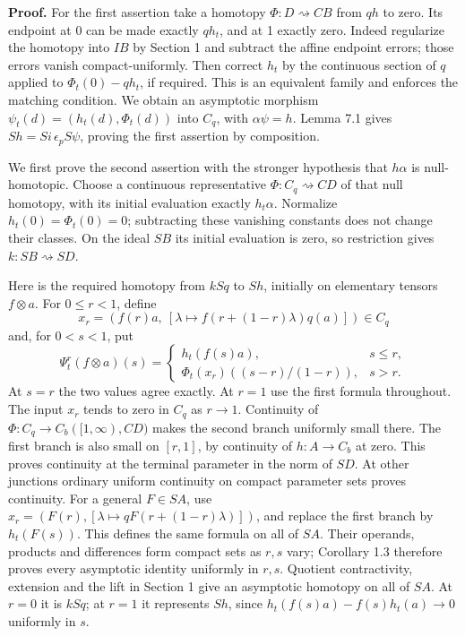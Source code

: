 \documentclass[
  11pt,
]{article}
\begin{document}
\textbf{Proof.} For the first assertion take a homotopy
\(\Phi:D \rightsquigarrow CB\) from \(qh\) to zero. Its endpoint at 0
can be made exactly \(qh_t\), and at 1 exactly zero. Indeed regularize
the homotopy into \(IB\) by Section 1 and subtract the affine endpoint
errors; those errors vanish compact-uniformly. Then correct \(h_t\) by
the continuous section of \(q\) applied to \(\Phi_t(0)-qh_t\), if
required. This is an equivalent family and enforces the matching
condition. We obtain an asymptotic morphism
\(\psi_t(d)=(h_t(d),\Phi_t(d))\) into \(C_q\), with \(\alpha\psi=h\).
Lemma 7.1 gives \(Sh=Si\,\epsilon_p S\psi\), proving the first assertion
by composition.

We first prove the second assertion with the stronger hypothesis that
\(h\alpha\) is null-homotopic. Choose a continuous representative
\(\Phi:C_q\rightsquigarrow CD\) of that null homotopy, with its initial
evaluation exactly \(h_t\alpha\). Normalize \(h_t(0)=\Phi_t(0)=0\);
subtracting these vanishing constants does not change their classes. On
the ideal \(SB\) its initial evaluation is zero, so restriction gives
\(k:SB \rightsquigarrow SD\).

Here is the required homotopy from \(kSq\) to \(Sh\), initially on
elementary tensors \(f\otimes a\). For \(0\leq r<1\), define \[
x_r=(f(r)a,\ [\lambda\mapsto f(r+(1-r)\lambda)q(a)])\in C_q
\tag{7.4}
\] and, for \(0<s<1\), put \[
\Psi_t^r(f\otimes a)(s)=
\begin{cases}
h_t(f(s)a),&s\leq r,\\
\Phi_t(x_r)((s-r)/(1-r)),&s>r.
\end{cases}
\tag{7.5}
\] At \(s=r\) the two values agree exactly. At \(r=1\) use the first
formula throughout. The input \(x_r\) tends to zero in \(C_q\) as
\(r\to1\). Continuity of \(\Phi:C_q\to C_b([1,\infty),CD)\) makes the
second branch uniformly small there. The first branch is also small on
\([r,1]\), by continuity of \(h:A\to C_b\) at zero. This proves
continuity at the terminal parameter in the norm of \(SD\). At other
junctions ordinary uniform continuity on compact parameter sets proves
continuity. For a general \(F\in SA\), use
\(x_r=(F(r),[\lambda\mapsto qF(r+(1-r)\lambda)])\), and replace the
first branch by \(h_t(F(s))\). This defines the same formula on all of
\(SA\). Their operands, products and differences form compact sets as
\(r,s\) vary; Corollary 1.3 therefore proves every asymptotic identity
uniformly in \(r,s\). Quotient contractivity, extension and the lift in
Section 1 give an asymptotic homotopy on all of \(SA\). At \(r=0\) it is
\(kSq\); at \(r=1\) it represents \(Sh\), since
\(h_t(f(s)a)-f(s)h_t(a)\to0\) uniformly in \(s\).
\end{document}
